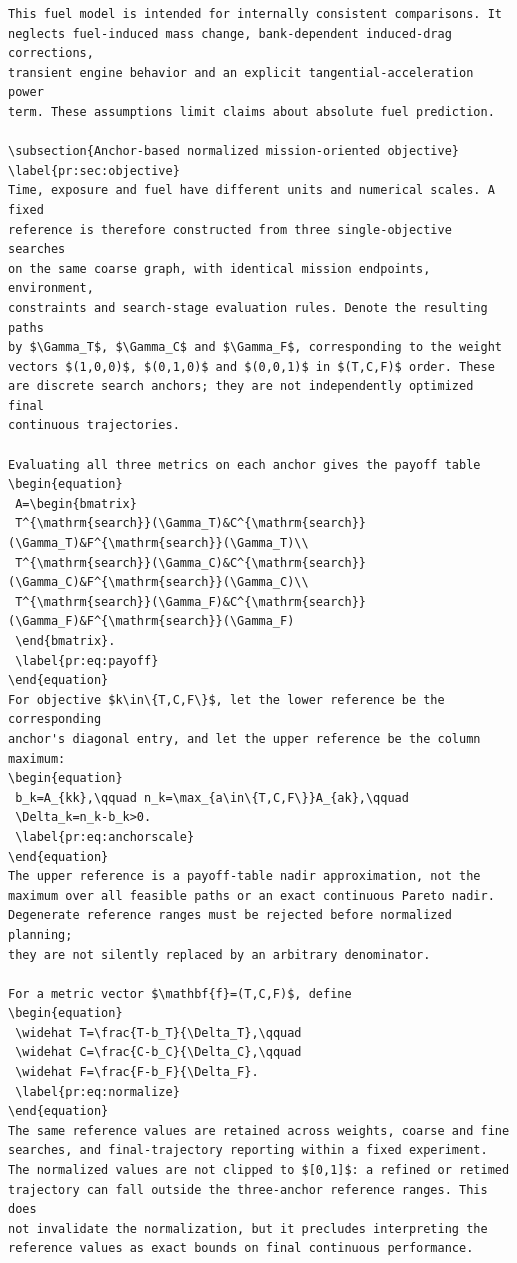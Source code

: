 \documentclass[12pt]{article}
\begin{document}
\begin{verbatim}
This fuel model is intended for internally consistent comparisons. It
neglects fuel-induced mass change, bank-dependent induced-drag corrections,
transient engine behavior and an explicit tangential-acceleration power
term. These assumptions limit claims about absolute fuel prediction.

\subsection{Anchor-based normalized mission-oriented objective}
\label{pr:sec:objective}
Time, exposure and fuel have different units and numerical scales. A fixed
reference is therefore constructed from three single-objective searches
on the same coarse graph, with identical mission endpoints, environment,
constraints and search-stage evaluation rules. Denote the resulting paths
by $\Gamma_T$, $\Gamma_C$ and $\Gamma_F$, corresponding to the weight
vectors $(1,0,0)$, $(0,1,0)$ and $(0,0,1)$ in $(T,C,F)$ order. These
are discrete search anchors; they are not independently optimized final
continuous trajectories.

Evaluating all three metrics on each anchor gives the payoff table
\begin{equation}
 A=\begin{bmatrix}
 T^{\mathrm{search}}(\Gamma_T)&C^{\mathrm{search}}(\Gamma_T)&F^{\mathrm{search}}(\Gamma_T)\\
 T^{\mathrm{search}}(\Gamma_C)&C^{\mathrm{search}}(\Gamma_C)&F^{\mathrm{search}}(\Gamma_C)\\
 T^{\mathrm{search}}(\Gamma_F)&C^{\mathrm{search}}(\Gamma_F)&F^{\mathrm{search}}(\Gamma_F)
 \end{bmatrix}.
 \label{pr:eq:payoff}
\end{equation}
For objective $k\in\{T,C,F\}$, let the lower reference be the corresponding
anchor's diagonal entry, and let the upper reference be the column maximum:
\begin{equation}
 b_k=A_{kk},\qquad n_k=\max_{a\in\{T,C,F\}}A_{ak},\qquad
 \Delta_k=n_k-b_k>0.
 \label{pr:eq:anchorscale}
\end{equation}
The upper reference is a payoff-table nadir approximation, not the
maximum over all feasible paths or an exact continuous Pareto nadir.
Degenerate reference ranges must be rejected before normalized planning;
they are not silently replaced by an arbitrary denominator.

For a metric vector $\mathbf{f}=(T,C,F)$, define
\begin{equation}
 \widehat T=\frac{T-b_T}{\Delta_T},\qquad
 \widehat C=\frac{C-b_C}{\Delta_C},\qquad
 \widehat F=\frac{F-b_F}{\Delta_F}.
 \label{pr:eq:normalize}
\end{equation}
The same reference values are retained across weights, coarse and fine
searches, and final-trajectory reporting within a fixed experiment.
The normalized values are not clipped to $[0,1]$: a refined or retimed
trajectory can fall outside the three-anchor reference ranges. This does
not invalidate the normalization, but it precludes interpreting the
reference values as exact bounds on final continuous performance.


\end{verbatim}
\end{document}
